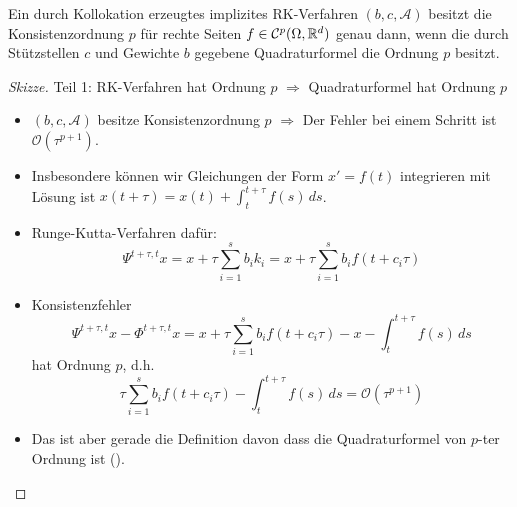 \begin{satz} \label{thm:ordnung_quadratur_kollokation}
	Ein durch Kollokation erzeugtes implizites RK-Verfahren $(b,c,\mathcal{A})$ besitzt die Konsistenzordnung $p$ für rechte Seiten $f\in\mathcal{C}^p (\Omega,\mathbb R^d)$ genau dann, wenn die durch Stützstellen $c$ und Gewichte $b$ gegebene Quadraturformel die Ordnung $p$ besitzt.
\end{satz}
\begin{proof}[Skizze] 
	Teil 1: RK-Verfahren hat Ordnung $p$ \quad $\Rightarrow$ \quad Quadraturformel hat Ordnung $p$
	\begin{itemize}
		\item $(b,c,\mathcal{A})$ besitze Konsistenzordnung $p$ $\Rightarrow$ Der Fehler bei einem Schritt ist $\mathcal{O}(\tau^{p+1})$.
		\item Insbesondere können wir Gleichungen der Form $x'=f(t)$ integrieren mit Lösung ist $x(t+\tau) = x(t) + \int_t^{t+\tau} f(s)\,ds$.
		\item Runge-Kutta-Verfahren dafür:
		\begin{equation*}
			\Psi^{t+\tau,t} x = x + \tau\sum_{i=1}^s b_ik_i = x + \tau\sum_{i=1}^s b_i f(t+c_i\tau)
		\end{equation*}
		\item Konsistenzfehler
		\begin{equation*}
			\Psi^{t+\tau,t} x - \Phi^{t+\tau,t} x = x + \tau\sum_{i=1}^s b_i f(t+c_i\tau) - x - \int_t^{t+\tau} f(s)\,ds
		\end{equation*}
		hat Ordnung $p$, d.h.
		\begin{equation*}
			\tau\sum_{i=1}^s b_i f(t+c_i\tau) - \int_t^{t+\tau} f(s)\,ds
			= \mathcal{O}(\tau^{p+1})
		\end{equation*}
	
		\item Das ist aber gerade die Definition davon dass die Quadraturformel
		von $p$-ter Ordnung ist (\cite[Lemma~6.39]{deuflhard_bornemann:2008}).
	\end{itemize}
	

\end{proof}

